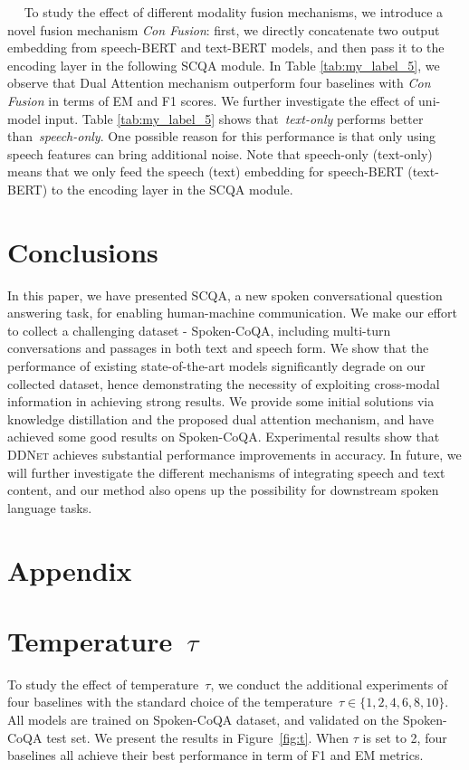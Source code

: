 \documentclass[11pt]{article}
\newcommand{\myparagraph}[1]{\vspace{2pt}\noindent{\bf{#1}}~~}
\begin{document}
\myparagraph{Multi-Modality Fusion Mechanism.}
To study the effect of different modality fusion mechanisms, we introduce a novel fusion mechanism \textit{Con Fusion}: first, we directly concatenate two output embedding from speech-BERT and text-BERT models, and then pass it to the encoding layer in the following SCQA module. In Table \ref{tab:my_label_5}, we observe that Dual Attention mechanism outperform four baselines with \textit{Con Fusion} in terms of EM and F1 scores. We further investigate the effect of uni-model input. Table \ref{tab:my_label_5} shows that~\textit{text-only} performs better than~\textit{speech-only}. One possible reason for this performance is that only using speech features can bring additional noise. Note that speech-only (text-only) means that we only feed the speech (text) embedding for speech-BERT (text-BERT) to the encoding layer in the SCQA module. 
\section{Conclusions}
In this paper, we have presented SCQA, a new spoken conversational question answering task, for enabling human-machine communication. We make our effort to collect a challenging dataset - Spoken-CoQA, including multi-turn conversations and passages in both text and speech form. We show that the performance of existing state-of-the-art models significantly degrade on our collected dataset, hence demonstrating the necessity of exploiting cross-modal information in achieving strong results. We provide some initial solutions via knowledge distillation and the proposed dual attention mechanism, and have achieved some good results on Spoken-CoQA. Experimental results show that \textsc{DDNet} achieves substantial performance improvements in accuracy.
In future, we will further investigate the different mechanisms of integrating speech and text content, and our method also opens up the possibility for downstream spoken language tasks.
 




\appendix

\section*{Appendix}
\label{sec:appendix}

\section{Temperature~$\tau$}
To study the effect of temperature~$\tau$, we conduct the additional experiments of four baselines with the standard choice of the temperature~$\tau \in \{1,2,4,6,8,10\}$. All models are trained on Spoken-CoQA dataset, and validated on the Spoken-CoQA test set. We present the results in Figure~\ref{fig:t}. When $\tau$ is set to 2, four baselines all achieve their best performance in term of F1 and EM metrics.
\end{document}
